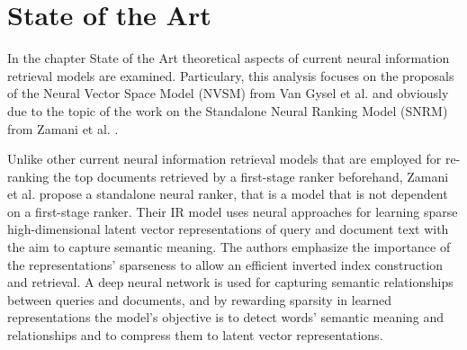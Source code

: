 \chapter{State of the Art} \label{chapter:state-of-the-art}

In the chapter State of the Art theoretical aspects of current neural 
    information retrieval models are examined.
Particulary, this analysis focuses on the proposals of the
    Neural Vector Space Model (NVSM) from
    Van Gysel et al. \cite{van-gysel:2017:neural-vector-spaces}
    and obviously due to the topic of the work on the
    Standalone Neural Ranking Model (SNRM) from 
    Zamani et al. \cite{zamani:2018:from-neural-reranking-to-neural-ranking}.

Unlike other current neural information retrieval models that 
    are employed for re-ranking the top documents retrieved by 
    a first-stage ranker beforehand,
    Zamani et al. propose a standalone neural ranker, that is
    a model that is not dependent on a first-stage ranker.
Their IR model uses neural approaches for learning sparse high-dimensional
    latent vector representations of query and document text 
    with the aim to capture semantic meaning.
The authors emphasize the importance of the representations' sparseness
    to allow an efficient inverted index construction and retrieval.
A deep neural network is used for capturing semantic relationships between
    queries and documents, and by rewarding sparsity in learned representations
    the model's objective is to detect words' semantic meaning and 
    relationships and to compress them to latent vector representations.
\cite{zamani:2018:from-neural-reranking-to-neural-ranking}